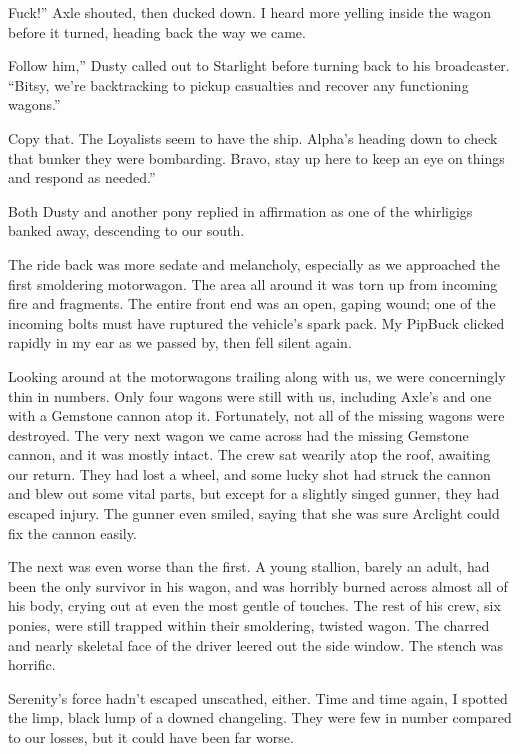 \leavevmode{}Fuck!” Axle shouted, then ducked down. I heard more yelling inside the wagon before it turned, heading back the way we came.

\leavevmode{}Follow him,” Dusty called out to Starlight before turning back to his broadcaster. “Bitsy, we’re backtracking to pickup casualties and recover any functioning wagons.”

\leavevmode{}Copy that. The Loyalists seem to have the ship. Alpha’s heading down to check that bunker they were bombarding. Bravo, stay up here to keep an eye on things and respond as needed.”

Both Dusty and another pony replied in affirmation as one of the whirligigs banked away, descending to our south.

The ride back was more sedate and melancholy, especially as we approached the first smoldering motorwagon. The area all around it was torn up from incoming fire and fragments. The entire front end was an open, gaping wound; one of the incoming bolts must have ruptured the vehicle’s spark pack. My PipBuck clicked rapidly in my ear as we passed by, then fell silent again.

Looking around at the motorwagons trailing along with us, we were concerningly thin in numbers. Only four wagons were still with us, including Axle’s and one with a Gemstone cannon atop it. Fortunately, not all of the missing wagons were destroyed. The very next wagon we came across had the missing Gemstone cannon, and it was mostly intact. The crew sat wearily atop the roof, awaiting our return. They had lost a wheel, and some lucky shot had struck the cannon and blew out some vital parts, but except for a slightly singed gunner, they had escaped injury. The gunner even smiled, saying that she was sure Arclight could fix the cannon easily.

The next was even worse than the first. A young stallion, barely an adult, had been the only survivor in his wagon, and was horribly burned across almost all of his body, crying out at even the most gentle of touches. The rest of his crew, six ponies, were still trapped within their smoldering, twisted wagon. The charred and nearly skeletal face of the driver leered out the side window. The stench was horrific.

Serenity’s force hadn’t escaped unscathed, either. Time and time again, I spotted the limp, black lump of a downed changeling. They were few in number compared to our losses, but it could have been far worse.

